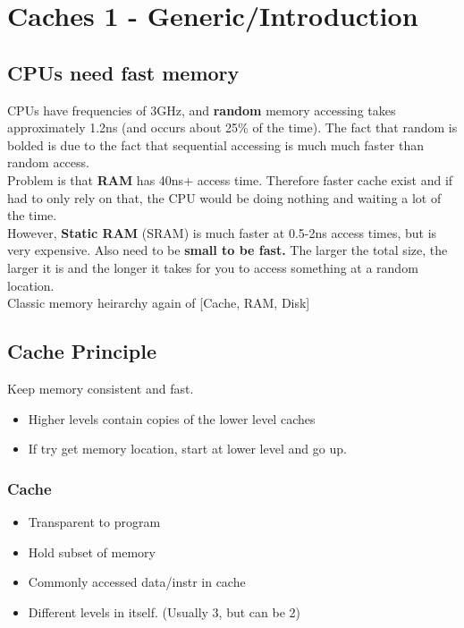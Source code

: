 \documentclass{article}
\begin{document}
				

\section{Caches 1 - Generic/Introduction}
	\subsection*{CPUs need fast memory}
		CPUs have frequencies of 3GHz, and \textbf{random} memory accessing takes approximately 1.2ns (and occurs about 25\% of the time). The fact that random is bolded is due to the fact that sequential accessing is much much faster than random access.\\

		Problem is that \textbf{RAM} has 40ns+ access time. Therefore faster cache exist and if had to only rely on that, the CPU would be doing nothing and waiting a lot of the time.\\

		However, \textbf{Static RAM} (SRAM) is much faster at 0.5-2ns access times, but is very expensive. Also need to be \textbf{small to be fast.} The larger the total size, the larger it is and the longer it takes for you to access something at a random location.\\

		Classic memory heirarchy again of [Cache, RAM, Disk]

	\subsection*{Cache Principle}
		Keep memory consistent and fast.
		\begin{itemize}
			\item Higher levels contain copies of the lower level caches
			\item If try get memory location, start at lower level and go up.
		\end{itemize}

		\subsubsection*{Cache}
		\begin{itemize}
			\item Transparent to program
			\item Hold subset of memory
			\item Commonly accessed data/instr in cache
			\item Different levels in itself. (Usually 3, but can be 2)
		\end{itemize}
\end{document}
